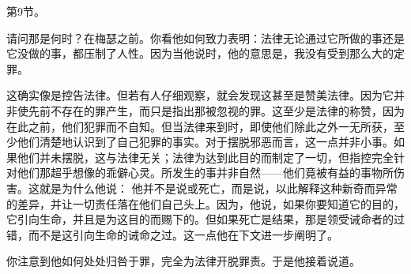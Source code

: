 第9节。\par

请问那是何时？在梅瑟之前。你看他如何致力表明：法律无论通过它所做的事还是它没做的事，都压制了人性。因为当他说时，他的意思是，我没有受到那么大的定罪。\par

\par

这确实像是控告法律。但若有人仔细观察，就会发现这甚至是赞美法律。因为它并非使先前不存在的罪产生，而只是指出那被忽视的罪。这至少是法律的称赞，因为在此之前，他们犯罪而不自知。但当法律来到时，即使他们除此之外一无所获，至少他们清楚地认识到了自己犯罪的事实。对于摆脱邪恶而言，这一点并非小事。如果他们并未摆脱，这与法律无关；法律为达到此目的而制定了一切，但指控完全针对他们那超乎想像的乖僻心灵。所发生的事并非自然——他们竟被有益的事物所伤害。这就是为什么他说： 他并不是说或死亡，而是说，以此解释这种新奇而异常的差异，并让一切责任落在他们自己头上。因为，他说，如果你要知道它的目的，它引向生命，并且是为这目的而赐下的。但如果死亡是结果，那是领受诫命者的过错，而不是这引向生命的诫命之过。这一点他在下文进一步阐明了。\par

 \par

你注意到他如何处处归咎于罪，完全为法律开脱罪责。于是他接着说道。\par

 \par

